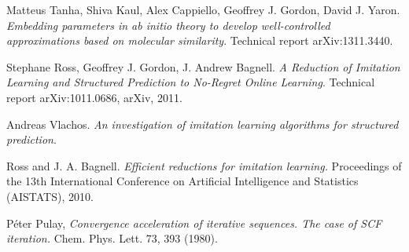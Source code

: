 \documentclass[twoside]{article}
\begin{document}
\begin{thebibliography}{9}
  Matteus Tanha, Shiva Kaul, Alex Cappiello, Geoffrey J. Gordon, David J. Yaron.
  \emph{Embedding parameters in ab initio theory to develop well-controlled approximations based on molecular similarity}.
  Technical report arXiv:1311.3440.
  
  Stephane Ross, Geoffrey J. Gordon, J. Andrew Bagnell.
  \emph{A Reduction of Imitation Learning and Structured Prediction to No-Regret Online Learning}.
  Technical report arXiv:1011.0686, arXiv, 2011.
  
  Andreas Vlachos.
  \emph{An investigation of imitation learning algorithms for structured prediction}.
  
    Ross and J. A. Bagnell.
  \emph{Efficient reductions for imitation
learning.} Proceedings of the 13th International
Conference on Artificial Intelligence and Statistics (AISTATS),
2010.

   Péter Pulay,
  \emph{Convergence acceleration of iterative sequences. The case of SCF iteration.} Chem. Phys. Lett. 73, 393 (1980).

\end{thebibliography}
\end{document}

